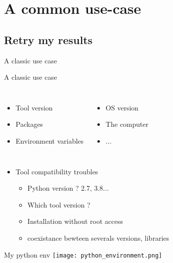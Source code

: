 \section{A common use-case}
\subsection{Retry my results}

\begin{frame}{A classic use case}
\end{frame}
\begin{frame}{A classic use case}
\begin{columns}
\begin{itemize}
	\item Tool version
	\item Packages
	\item Environment variables
\end{itemize}
\begin{itemize}
	\item OS version
	\item The computer 
	\item ...
\end{itemize}
\end{columns}
\end{frame}

\begin{frame}
\begin{itemize}
\item Tool compatibility troubles
	\begin{itemize}
	\item Python version ? 2.7, 3.8...
	\item Which tool version ?
	\item Installation without root access
	\item coexistance bewteen severals versions, libraries
	\end{itemize}
\end{itemize}
\end{frame}

\begin{frame}{My python env}
\centering\texttt{[image: python\_environment.png]} 
\end{frame}

